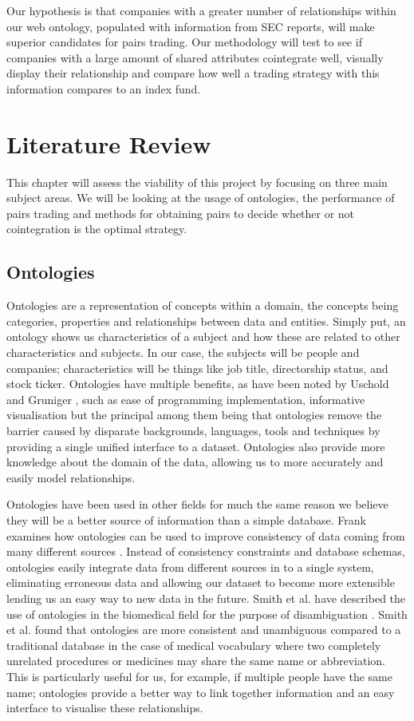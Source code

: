 \documentclass{UoYCSproject}
\begin{document}
Our hypothesis is that companies with a greater number of relationships within our web ontology, populated with information from SEC reports, will make superior candidates for pairs trading. Our methodology will test to see if companies with a large amount of shared attributes cointegrate well, visually display their relationship and compare how well a trading strategy with this information compares to an index fund.

\chapter{Literature Review}
\label{cha:Literature Review}

This chapter will assess the viability of this project by focusing on three main subject areas. We will be looking at the usage of ontologies, the performance of pairs trading and methods for obtaining pairs to decide whether or not cointegration is the optimal strategy.

\section{Ontologies}

Ontologies are a representation of concepts within a domain, the concepts being categories, properties and relationships between data and entities. Simply put, an ontology shows us characteristics of a subject and how these are related to other characteristics and subjects. In our case, the subjects will be people and companies; characteristics will be things like job title, directorship status, and stock ticker. Ontologies have multiple benefits, as have been noted by Uschold and Gruniger \parencite{ontdef}, such as ease of programming implementation, informative visualisation but the principal among them being that ontologies remove the barrier caused by disparate backgrounds, languages, tools and techniques by providing a single unified interface to a dataset. Ontologies also provide more knowledge about the domain of the data, allowing us to more accurately and easily model relationships.

Ontologies have been used in other fields for much the same reason we believe they will be a better source of information than a simple database. Frank examines how ontologies can be used to improve consistency of data coming from many different sources \parencite{ontgeog}. Instead of consistency constraints and database schemas, ontologies easily integrate data from different sources in to a single system, eliminating erroneous data and allowing our dataset to become more extensible lending us an easy way to new data in the future. Smith et al. have described the use of ontologies in the biomedical field for the purpose of disambiguation \parencite{ontbio}. Smith et al. found that ontologies are more consistent and unambiguous compared to a traditional database in the case of medical vocabulary where two completely unrelated procedures or medicines may share the same name or abbreviation. This is particularly useful for us, for example, if multiple people have the same name; ontologies provide a better way to link together information and an easy interface to visualise these relationships.
\end{document}
